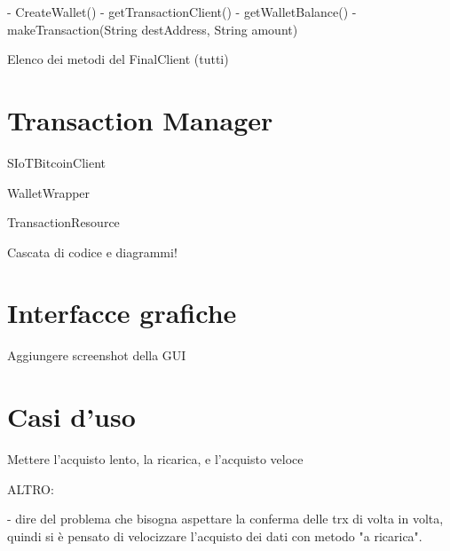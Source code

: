 - CreateWallet()
- getTransactionClient()
- getWalletBalance()
- makeTransaction(String destAddress, String amount)

Elenco dei metodi del FinalClient (tutti)

\section{Transaction Manager}
\label{c:integr:trxmanager}

SIoTBitcoinClient

WalletWrapper

TransactionResource


Cascata di codice e diagrammi!

\section{Interfacce grafiche}
\label{c:integr:gui}

Aggiungere screenshot della GUI



\section{Casi d'uso}
\label{c:integr:useCase}

Mettere l'acquisto lento, la ricarica, e l'acquisto veloce


ALTRO:

- dire del problema che bisogna aspettare la conferma delle trx di volta in volta, quindi si è pensato di velocizzare l'acquisto dei dati con metodo "a ricarica".
